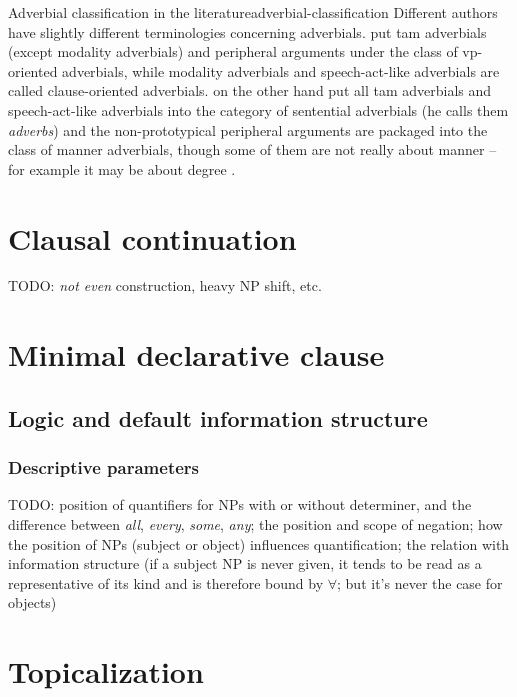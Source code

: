 \documentclass[UTF8, a4paper, oneside, scheme=plain]{ctexrep}
\newcommand*{\citepage}[1]{pp.~{#1}}
\newcommand*{\term}[1]{\emph{#1}}
\newcommand{\corpus}[1]{\emph{#1}}
\begin{document}
\begin{infobox}{Adverbial classification in the literature}{adverbial-classification}
    Different authors have slightly different terminologies concerning adverbials.
    \citet[\citepage{576}]{cgel} put \acs{tam} adverbials (except modality adverbials) 
    and peripheral arguments
    under the class of \acs{vp}-oriented adverbials, 
    while modality adverbials and speech-act-like adverbials are called clause-oriented adverbials.
    \citet[\citepage{386}]{dixon2005semantic} on the other hand 
    put all \acs{tam} adverbials and speech-act-like adverbials 
    into the category of sentential adverbials (he calls them \term{adverbs})
    and the non-prototypical peripheral arguments are packaged into the class of manner adverbials,
    though some of them are not really about manner -- 
    for example it may be about degree \citet[\citepage{576}]{cgel}.
\end{infobox}

\section{Clausal continuation}

TODO: \corpus{not even} construction, heavy NP shift, etc.

\section{Minimal declarative clause}

\subsection{Logic and default information structure}

\subsubsection{Descriptive parameters}

TODO: position of quantifiers for NPs with or without determiner,
and the difference between \corpus{all}, \corpus{every}, \corpus{some}, \corpus{any};
the position and scope of negation;
how the position of NPs (subject or object) influences quantification;
the relation with information structure
(if a subject NP is never given, 
it tends to be read as a representative of its kind and is therefore bound by $\forall$;
but it's never the case for objects)

\section{Topicalization}\label{sec:simple-clause.information.topicalization}
\end{document}
